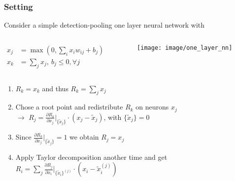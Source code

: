\documentclass{beamer}
\begin{document}
\begin{frame}
\frametitle{Setting}
\vspace{0.5cm}

Consider a simple detection-pooling one layer neural network with
\vspace{-0.2cm}
 \begin{columns}
          \begin{column}[T]{5.5cm}
		\begin{align*}
		x_j &= \max(0, \sum_i x_i w_{ij} + b_j)\\
		x_k &= \sum_j x_j, \ b_j \leq 0, \forall j
		\end{align*}
            \end{column} 
            \begin{column}[T]{6.5cm}
			\begin{figure}
				\texttt{[image: image/one\_layer\_nn]}
			\end{figure}
	\end{column}
\end{columns} 
\vspace{0.25cm}

\pause
\begin{enumerate}
\item $R_k = x_k$ and thus $R_k = \sum_j x_j$
\item  Chose a root point and redistribute $R_k$ on neurons $x_j$\\
$\rightarrow$ $R_j = \frac{\partial R_k}{\partial x_j}\Big|_{\{\tilde{x}_j\}} \cdot (x_j - \tilde{x}_j) $, with $\{\tilde{x}_j\}=0$
\item Since $\frac{\partial R_k}{\partial x_j}\Big|_{\{\tilde{x}_j\}}=1$ we obtain $R_j = x_j$
\item Apply Taylor decomposition another time and get\\
 $R_i = \sum_j\frac{\partial R_j}{\partial x_i}\Big|_{\{\tilde{x}_i\}^{(j)}} \cdot (x_i - \tilde{x}_i^{(j)})$
\end{enumerate}



\end{frame}
\end{document}
